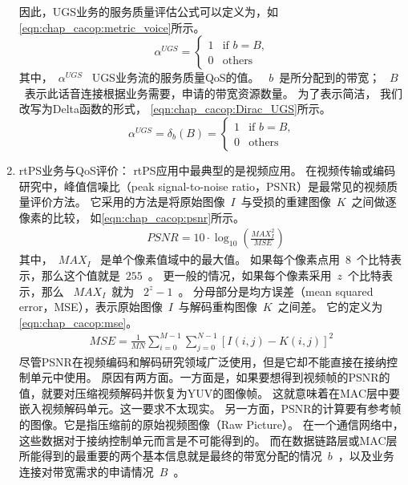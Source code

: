\begin{enumerate}[(1)]
因此，UGS业务的服务质量评估公式可以定义为，如\eqref{eqn:chap_cacop:metric_voice}所示。
\begin{equation}
\label{eqn:chap_cacop:metric_voice}
\alpha^{UGS}=
\begin{cases}
1 & \text{if $b=B$,}\\
0 &\text{others}
\end{cases}
\end{equation}
其中，~$\alpha^{UGS}$~ UGS业务流的服务质量QoS的值。
~$b$~是所分配到的带宽；
~$B$~表示此话音连接根据业务需要，申请的带宽资源数量。
为了表示简洁，
我们改写为Delta函数的形式，
\eqref{eqn:chap_cacop:Dirac_UGS}所示。
%
\begin{equation}
\label{eqn:chap_cacop:Dirac_UGS}
\alpha^{UGS}= \delta_{b}(B) = 
\begin{cases}
1 & \text{if $b= B$,}\\
0 &\text{others}
\end{cases}
\end{equation}

\item rtPS业务与QoS评价： 
rtPS应用中最典型的是视频应用。
在视频传输或编码研究中，峰值信噪比（peak signal-to-noise ratio，PSNR）是最常见的视频质量评价方法。
它采用的方法是将原始图像~$I$~与受损的重建图像~$K$~之间做逐像素的比较，
如\eqref{eqn:chap_cacop:psnr}所示。 
%
\begin{align}
\label{eqn:chap_cacop:psnr}
& PSNR = 10 \cdot \log_{10} \left( \frac{MAX_I^2}{MSE} \right)
\end{align}
其中，~$MAX_I$~ 是单个像素值域中的最大值。
如果每个像素点用~$8$~个比特表示，那么这个值就是~$255$~。
更一般的情况，如果每个像素采用~$z$~个比特表示，那么 ~$MAX_I$~就为 ~$2^z - 1$~。
分母部分是均方误差（mean squared error，MSE），表示原始图像~$I$~与解码重构图像~$K$~之间差。
它的定义为\eqref{eqn:chap_cacop:mse}。
\begin{align}
\label{eqn:chap_cacop:mse}
MSE = \frac{1}{MN} \sum_{i=0}^{M-1}\sum_{j=0}^{N-1} \left[I(i,j) - K(i,j)\right]^2 
\end{align}
尽管PSNR在视频编码和解码研究领域广泛使用，但是它却不能直接在接纳控制单元中使用。
原因有两方面。一方面是，如果要想得到视频帧的PSNR的值，就要对压缩视频解码并恢复为YUV的图像帧。
这就意味着在MAC层中要嵌入视频解码单元。这一要求不太现实。
另一方面，PSNR的计算要有参考帧的图像。它是指压缩前的原始视频图像（Raw Picture）。
在一个通信网络中，这些数据对于接纳控制单元而言是不可能得到的。
而在数据链路层或MAC层所能得到的最重要的两个基本信息就是最终的带宽分配的情况~$b$~，以及业务连接对带宽需求的申请情况~$B$~。


\end{enumerate}
